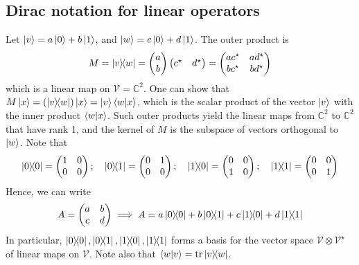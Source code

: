 \subsection{Dirac notation for linear operators}
Let \( \ket{v} = a \ket{0} + b \ket{1} \), and \( \ket{w} = c \ket{0} + d \ket{1} \).
The outer product is
\[ M = \op{v}{w} = \begin{pmatrix}
    a \\ b
\end{pmatrix} \begin{pmatrix}
    c^\star & d^\star
\end{pmatrix} = \begin{pmatrix}
    ac^\star & ad^\star \\
    bc^\star & bd^\star
\end{pmatrix} \]
which is a linear map on \( \mathcal V = \mathbb C^2 \).
One can show that \( M \ket{x} = \qty(\op{v}{w})\ket{x} = \ket{v} \ip{w}{x} \), which is the scalar product of the vector \( \ket{v} \) with the inner product \( \ip{w}{x} \).
Such outer products yield the linear maps from \( \mathbb C^2 \) to \( \mathbb C^2 \) that have rank 1, and the kernel of \( M \) is the subspace of vectors orthogonal to \( \ket{w} \).
Note that
\[ \op{0}{0} = \begin{pmatrix}
    1 & 0 \\
    0 & 0
\end{pmatrix};\quad \op{0}{1} = \begin{pmatrix}
    0 & 1 \\
    0 & 0
\end{pmatrix};\quad \op{1}{0} = \begin{pmatrix}
    0 & 0 \\
    1 & 0
\end{pmatrix};\quad \op{1}{1} = \begin{pmatrix}
    0 & 0 \\
    0 & 1
\end{pmatrix} \]
Hence, we can write
\[ A = \begin{pmatrix}
    a & b \\
    c & d
\end{pmatrix} \implies A = a \op{0}{0} + b \op{0}{1} + c \op{1}{0} + d \op{1}{1} \]
In particular, \( \op{0}{0}, \op{0}{1}, \op{1}{0}, \op{1}{1} \) forms a basis for the vector space \( \mathcal V \otimes \mathcal V^\star \) of linear maps on \( \mathcal V \).
Note also that \( \ip{w}{v} = \tr \op{v}{w} \).

